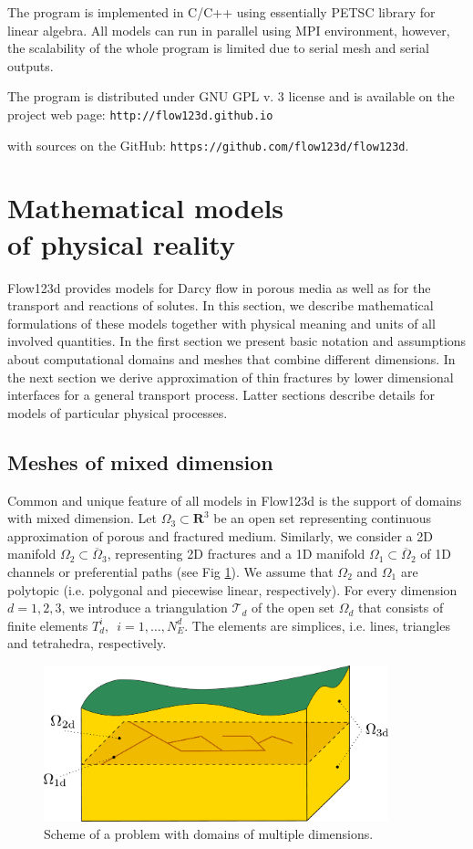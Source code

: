 \documentclass[a4paper]{article}
\def\Real{{\mathbf R}}
\begin{document}
The program is implemented in C/C++ using essentially PETSC library for linear algebra. All models can run in parallel using MPI environment, however, 
the scalability of the whole program is limited due to serial mesh and serial outputs.


The program is distributed under GNU GPL v. 3 license and is available on the project web page:
\verb'http://flow123d.github.io'

with sources on the GitHub:
\verb'https://github.com/flow123d/flow123d'.


\section{Mathematical models \\of physical reality}
\label{PhysicalModels}

Flow123d provides models for Darcy flow in porous media as well as for the transport and reactions of solutes. In this section, we describe 
mathematical formulations of these models together with physical meaning and units of all involved quantities. In the first section we present 
basic notation and assumptions about computational domains and meshes that combine different dimensions. In the next section we
derive approximation of thin fractures by lower dimensional interfaces for a general transport process. Latter sections describe details for models of particular
physical processes.

\subsection{Meshes of mixed dimension}
Common and unique feature of all models in Flow123d is the support of
domains with mixed dimension. 
Let $\Omega_{3} \subset \Real^3$ be an open set representing continuous approximation of porous and fractured medium.
Similarly, we consider a 2D manifold $\Omega_2\subset\overline\Omega_3$, representing 2D fractures and a 1D manifold $\Omega_1\subset \overline\Omega_2$ of 1D channels or preferential paths (see Fig \ref{fig:multi-dim}).
We assume that $\Omega_2$ and $\Omega_1$ are polytopic (i.e. polygonal and piecewise linear, respectively).
For every dimension $d=1,2,3$, we introduce a triangulation $\mathcal{T}_{d}$ of the open set $\Omega_d$
that consists of finite elements $T_{d}^{i},$\ $i = 1,\dots,N_{E}^{d}$.
The elements are simplices, i.e. lines, triangles and tetrahedra, respectively.

\begin{figure}[h]
\centering
\includegraphics[width=10cm]{figures/ground_fractures}
\caption{
    \label{fig:multi-dim}
    Scheme of a problem with domains of multiple dimensions.
}
\end{figure}
\end{document}
